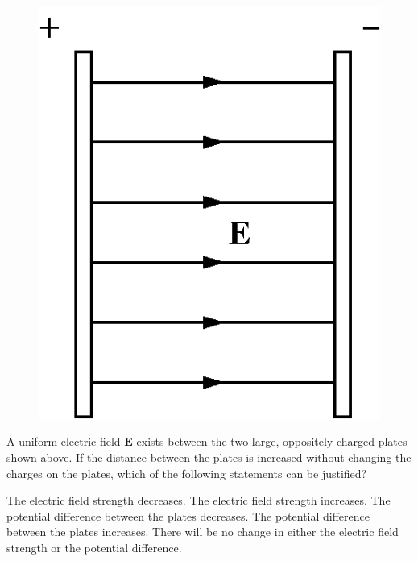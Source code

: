 \begin{figure}[H]
    \center
    \includegraphics[scale=0.25]{images/img-008-017.png}
\end{figure}

\begin{questions}\setcounter{question}{19}\question
A uniform electric field $\mathbf{E}$ exists between the two large, oppositely charged plates shown above. If the distance between the plates is increased without changing the charges on the plates, which of the following statements can be justified?

\begin{choices}
\choice The electric field strength decreases.
\choice The electric field strength increases.
\choice The potential difference between the plates decreases.
\choice The potential difference between the plates increases.
\choice There will be no change in either the electric field strength or the potential  difference.
\end{choices}\end{questions}

